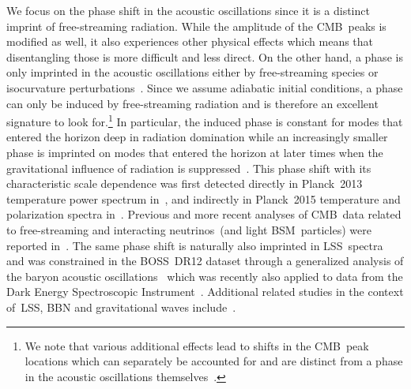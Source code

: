 We focus on the phase shift in the acoustic oscillations since it is a distinct imprint of free-streaming radiation. While the amplitude of the CMB~peaks is modified as well, it also experiences other physical effects which means that disentangling those is more difficult and less direct. On the other hand, a phase is only imprinted in the acoustic oscillations either by free-streaming species or isocurvature perturbations~\cite{Baumann:2015rya}. Since we assume adiabatic initial conditions, a phase can only be induced by free-streaming radiation and is therefore an excellent signature to look for.\footnote{We note that various additional effects lead to shifts in the CMB~peak locations which can separately be accounted for and are distinct from a phase in the acoustic oscillations themselves~\cite{Pan:2016zla}.} In particular, the induced phase is constant for modes that entered the horizon deep in radiation domination while an increasingly smaller phase is imprinted on modes that entered the horizon at later times when the gravitational influence of radiation is suppressed~\cite{Bashinsky:2003tk, Baumann:2015rya}. This phase shift with its characteristic scale dependence was first detected directly in Planck~2013 temperature power spectrum in~\cite{Follin:2015hya}, and indirectly in Planck~2015 temperature and polarization spectra in~\cite{Baumann:2015rya}. Previous and more recent analyses of CMB~data related to free-streaming and interacting neutrinos~(and light BSM~particles) were reported in~\cite{Bell:2005dr, Friedland:2007vv, Cyr-Racine:2013jua, Wilkinson:2014ksa, Oldengott:2014qra, Brust:2017nmv, Lancaster:2017ksf, Choi:2018gho, Kreisch:2019yzn, Park:2019ibn, Forastieri:2019cuf, Ghosh:2019tab, Blinov:2020hmc, Das:2020xke, RoyChoudhury:2020dmd, Brinckmann:2020bcn, Ghosh:2021axu, Venzor:2022hql, Kreisch:2022zxp, Taule:2022jrz, RoyChoudhury:2022rva, Ge:2022qws, Brinckmann:2022ajr, Das:2023npl, Venzor:2023aka, Ange:2023ygk, Allali:2024cji, Ghosh:2024wva}. The same phase shift is naturally also imprinted in LSS~spectra~\cite{Baumann:2017lmt, Baumann:2017gkg, Green:2020fjb} and was constrained in the BOSS~DR12 dataset through a generalized analysis of the baryon acoustic oscillations~\cite{Baumann:2017gkg, Baumann:2019keh} which was recently also applied to data from the Dark Energy Spectroscopic Instrument~\cite{Whitford:2024ecj}. Additional related studies in the context of~LSS, BBN and gravitational waves include~\cite{Ghosh:2017jdy, Lague:2019yvs, Grohs:2020xxd, MoradinezhadDizgah:2021upg, Yeh:2022heq, Loverde:2022wih, Camarena:2023cku, He:2023oke, Lee:2023uxu, Camarena:2024daj, Bond:2024ivb}.

